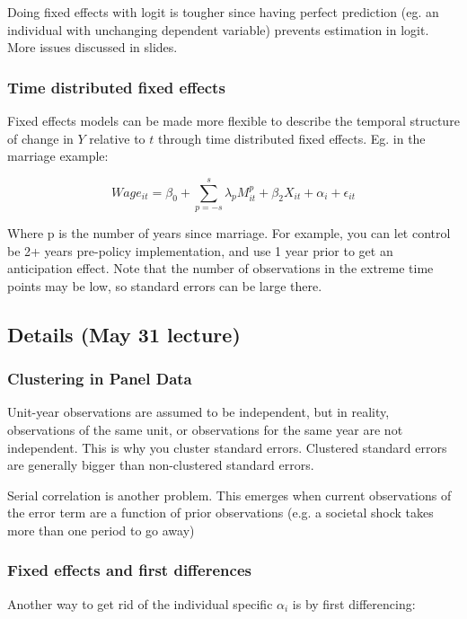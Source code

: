 \documentclass[12 pt, leqno]{article}
\begin{document}
Doing fixed effects with logit is tougher since having perfect prediction (eg. an individual with unchanging dependent variable) prevents estimation in logit. More issues discussed in slides.

\subsubsection{Time distributed fixed effects}

Fixed effects models can be made more flexible to describe the temporal structure of change in $Y$ relative to $t$ through time distributed fixed effects. Eg. in the marriage example:

$$Wage_{it} = \beta_0 + \sum_{p = -s}^{s}{\lambda_p M_{it}^p}  + \beta_2 X_{it} + \alpha_i + \epsilon_{it}$$
 
Where p is the number of years since marriage. For example, you can let control be 2+ years pre-policy implementation, and use 1 year prior to get an anticipation effect. Note that the number of observations in the extreme time points may be low, so standard errors can be large there. 

\subsection{Details (May 31 lecture)} 

\subsubsection{Clustering in Panel Data}

Unit-year observations are assumed to be independent, but in reality, observations of the same unit, or observations for the same year are not independent. This is why you cluster standard errors. Clustered standard errors are generally bigger than non-clustered standard errors.

Serial correlation is another problem. This emerges when current observations of the error term are a function of prior observations (e.g. a societal shock takes more than one period to go away)

\subsubsection{Fixed effects and first differences}

Another way to get rid of the individual specific $\alpha_i$ is by first differencing:
\end{document}
